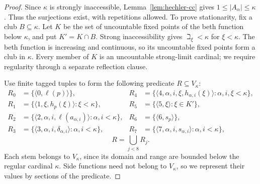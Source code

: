 \documentclass[11pt,a4paper]{amsart}
\theoremstyle{definition}
\theoremstyle{remark}
\begin{document}
\begin{proof}
Since \(\kappa\) is strongly inaccessible,
Lemma~\ref{lem:hechler-cc} gives \(1\leq|A_\alpha|\leq\kappa\).
Thus the surjections exist, with repetitions allowed. To prove
stationarity, fix a club \(B\subseteq\kappa\).
Let \(K\) be the set of uncountable fixed points of the beth
function below \(\kappa\), and put
\(K'=K\cap B\). Strong inaccessibility gives
\(\beth_\xi<\kappa\) for \(\xi<\kappa\). The beth function is
increasing and continuous, so its uncountable fixed points form a club
in \(\kappa\). Every member of \(K\) is an uncountable strong-limit
cardinal; we require regularity through a separate reflection clause.

Use finite tagged tuples to form the following predicate
\(R\subseteq V_\kappa\):
\[
\begin{aligned}
 R_0&=\{\langle0,\ell(p)\rangle\},&
 R_4&=\{\langle4,\alpha,i,\xi,h_{\alpha,i}(\xi)\rangle:
                                      \alpha,i,\xi<\kappa\},\\[.4em]
 R_1&=\{\langle1,\xi,h_p(\xi)\rangle:\xi<\kappa\},&
 R_5&=\{\langle5,\xi\rangle:\xi\in K'\},\\[.4em]
 R_2&=\{\langle2,\alpha,i,\ell(a_{\alpha,i})\rangle:
                                      \alpha,i<\kappa\},&
 R_6&=\{\langle6,s_p\rangle\},\\[.4em]
 R_3&=\{\langle3,\alpha,i,\delta_{\alpha,i}\rangle:
                                      \alpha,i<\kappa\},&
 R_7&=\{\langle7,\alpha,i,s_{\alpha,i}\rangle:
                                      \alpha,i<\kappa\},
\end{aligned}
\]
\[
 R=\bigcup_{j<8}R_j.
\]
Each stem belongs to \(V_\kappa\), since its domain and range
are bounded below the regular cardinal \(\kappa\). Side functions
need not belong to \(V_\kappa\), so we represent their values by
sections of the predicate.


\end{proof}
\end{document}
